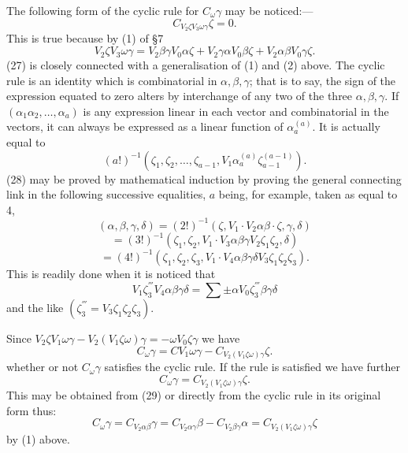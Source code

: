 \documentclass[11pt]{article}
\begin{document}
\indent The following form of the cyclic rule for $C_\omega\gamma$ may be noticed:---
\begin{equation}C_{V_2\zeta V_3\omega\gamma}\zeta=0.\tag{27}\end{equation}
This is true because by (1) of \S7
\[
V_2\zeta V_3\omega\gamma=V_2\beta\gamma V_0\alpha\zeta+V_2\gamma\alpha V_0\beta\zeta+V_2\alpha\beta V_0\gamma\zeta.
\]
(27) is closely connected with a generalisation of (1) and (2) above. The cyclic rule is an identity which is combinatorial in $\alpha,\beta,\gamma$; that is to say, the sign of the expression equated to zero alters by interchange of any two of the three $\alpha,\beta,\gamma$. If $(\alpha_1\alpha_2,\ldots,\alpha_a)$ is any expression linear in each vector and combinatorial in the vectors, it can always be expressed as a linear function of $\alpha_a^{(a)}$. It is actually equal to
\begin{equation}(a!)^{-1}(\zeta_1,\zeta_2,\ldots,\zeta_{a-1},V_1\alpha_a^{(a)}\zeta_{a-1}^{(a-1)}).\tag{28}\end{equation}
(28) may be proved by mathematical induction by proving the general connecting link in the following successive equalities, $a$ being, for example, taken as equal to 4,
\[
(\alpha,\beta,\gamma,\delta)=(2!)^{-1}(\zeta,V_1\mathbin{\cdot}V_2\alpha\beta\mathbin{\cdot}\zeta,\gamma,\delta)
\]
\[
=(3!)^{-1}(\zeta_1,\zeta_2,V_1\mathbin{\cdot}V_3\alpha\beta\gamma V_2\zeta_1\zeta_2,\delta)
\]
\[
=(4!)^{-1}(\zeta_1,\zeta_2,\zeta_3,V_1\mathbin{\cdot}V_4\alpha\beta\gamma\delta V_3\zeta_1\zeta_2\zeta_3).
\]
This is readily done when it is noticed that
\[
V_1\zeta_3^{'''}V_4\alpha\beta\gamma\delta=\sum\pm\alpha V_0\zeta_3^{'''}\beta\gamma\delta
\]
and the like $(\zeta_3^{'''}=V_3\zeta_1\zeta_2\zeta_3)$.

\indent Since $V_2\zeta V_1\omega\gamma-V_2(V_1\zeta\omega)\gamma=-\omega V_0\zeta\gamma$ we have
\begin{equation}C_\omega\gamma=CV_1\omega\gamma-C_{V_2(V_1\zeta\omega)\gamma}\zeta.\tag{29}\end{equation}
whether or not $C_\omega\gamma$ satisfies the cyclic rule. If the rule is satisfied we have further
\begin{equation}C_\omega\gamma=C_{V_2(V_1\zeta\omega)\gamma}\zeta.\tag{30}\end{equation}
This may be obtained from (29) or directly from the cyclic rule in its original form thus:
\[
C_\omega\gamma=C_{V_2\alpha\beta}\gamma=C_{V_2\alpha\gamma}\beta-C_{V_2\beta\gamma}\alpha=C_{V_2(V_1\zeta\omega)\gamma}\zeta
\]
by (1) above.
\end{document}
